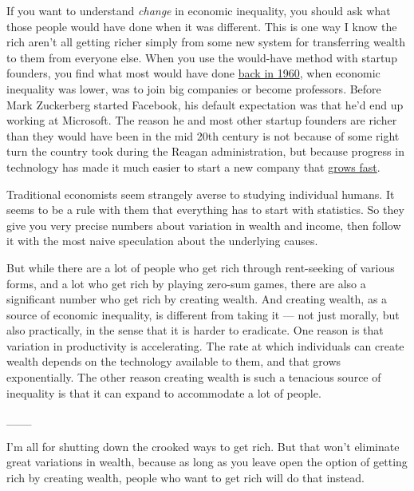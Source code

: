 If you want to understand \emph{change} in economic inequality, you
should ask what those people would have done when it was different. This
is one way I know the rich aren't all getting richer simply from some
new system for transferring wealth to them from everyone else. When you
use the would-have method with startup founders, you find what most
would have done \href{re.html}{back in 1960}, when economic inequality
was lower, was to join big companies or become professors. Before Mark
Zuckerberg started Facebook, his default expectation was that he'd end
up working at Microsoft. The reason he and most other startup founders
are richer than they would have been in the mid 20th century is not
because of some right turn the country took during the Reagan
administration, but because progress in technology has made it much
easier to start a new company that \href{growth.html}{grows fast}.

Traditional economists seem strangely averse to studying individual
humans. It seems to be a rule with them that everything has to start
with statistics. So they give you very precise numbers about variation
in wealth and income, then follow it with the most naive speculation
about the underlying causes.

But while there are a lot of people who get rich through rent-seeking of
various forms, and a lot who get rich by playing zero-sum games, there
are also a significant number who get rich by creating wealth. And
creating wealth, as a source of economic inequality, is different from
taking it --- not just morally, but also practically, in the sense that
it is harder to eradicate. One reason is that variation in productivity
is accelerating. The rate at which individuals can create wealth depends
on the technology available to them, and that grows exponentially. The
other reason creating wealth is such a tenacious source of inequality is
that it can expand to accommodate a lot of people.

\_\_\_

I'm all for shutting down the crooked ways to get rich. But that won't
eliminate great variations in wealth, because as long as you leave open
the option of getting rich by creating wealth, people who want to get
rich will do that instead.

